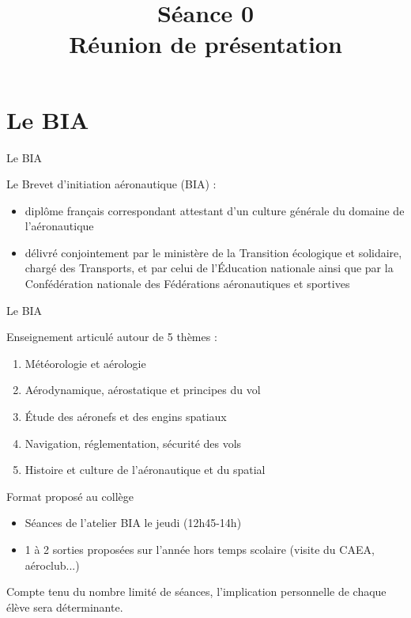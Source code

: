 

\title[Séance 0]{Séance 0 \\ Réunion de présentation}


 \begin{frame}
 \titlepage
 \end{frame}
 
 \begin{frame}
 \tableofcontents
 \end{frame}
 
\section{Le BIA}
\begin{frame}{Le BIA}

Le Brevet d'initiation aéronautique (BIA) :
\begin{itemize}
\item diplôme français correspondant attestant d'un culture générale du domaine de l'aéronautique
\item délivré conjointement par le ministère de la Transition écologique et solidaire, chargé des Transports, et par celui de l'Éducation nationale ainsi que par la Confédération nationale des Fédérations aéronautiques et sportives
\end{itemize}
\end{frame}

\begin{frame}{Le BIA}

Enseignement articulé autour de 5 thèmes :
\begin{enumerate}
\item Météorologie et aérologie
\item Aérodynamique, aérostatique et principes du vol
\item Étude des aéronefs et des engins spatiaux
\item Navigation, réglementation, sécurité des vols
\item Histoire et culture de l'aéronautique et du spatial
\end{enumerate}
\end{frame}

\begin{frame}{Format proposé au collège}
\begin{itemize}
	\item Séances de l'atelier BIA le jeudi (12h45-14h)
	\item 1 à 2 sorties proposées sur l'année hors temps scolaire (visite du CAEA, aéroclub...)
\end{itemize}

Compte tenu du nombre limité de séances, l'implication personnelle de chaque élève sera déterminante.

\end{frame}

